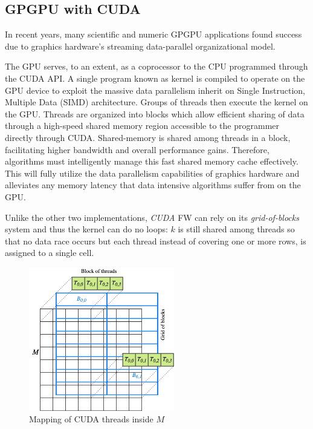 \subsection{GPGPU with CUDA}
In recent years, many scientific and numeric GPGPU applications found success due to graphics hardware’s streaming data-parallel organizational model. 

The GPU serves, to an extent, as a coprocessor to the CPU programmed through the CUDA API. A single program known as kernel is compiled to operate on the GPU
device to exploit the massive data parallelism inherit on Single Instruction, Multiple Data (SIMD) architecture. 
Groups of threads then execute the kernel on the GPU. Threads are organized into blocks which allow efficient sharing of
data through a high-speed shared memory region accessible to the programmer directly through CUDA. 
Shared-memory is shared among threads in a block, facilitating higher bandwidth and overall performance gains. 
Therefore, algorithms must intelligently manage this fast shared memory cache effectively. 
This will fully utilize the data parallelism capabilities of graphics
hardware and alleviates any memory latency that data intensive algorithms suffer from on the GPU.

Unlike the other two implementations, \emph{CUDA} FW can rely on its \emph{grid-of-blocks} system and thus the kernel can do no loops: $k$ is still shared among threads
so that no data race occurs but each thread instead of covering one or more rows, is assigned to a single cell. 



\begin{figure}[h!]
\centering                                                                        
\includegraphics[width=2.5in]{diagrams/cuda-threads}
\captionsetup{justification=centering}                                                                                                                                   
\caption{Mapping of CUDA threads inside $M$}                                                                                                                                            
\label{fig:cuda-threads}                                                                                                                                                           
\end{figure}


